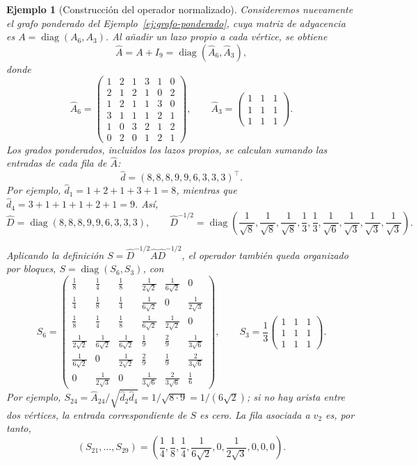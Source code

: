\documentclass[a4paper,openany,oneside,10pt]{report}
\theoremstyle{pnlTeorema}
\theoremstyle{pnlDefinicion}
\theoremstyle{pnlObservacion}
\newtheorem{ejemplo}{Ejemplo}[section]
\begin{document}
\begin{ejemplo}[Construcción del operador normalizado]\label{ej:operador-normalizado}
Consideremos nuevamente el grafo ponderado del Ejemplo~\ref{ej:grafo-ponderado}, cuya matriz de adyacencia es \(A=\operatorname{diag}(A_6,A_3)\). Al añadir un lazo propio a cada vértice, se obtiene
\[
\widehat A=A+I_9=\operatorname{diag}(\widehat A_6,\widehat A_3),
\]
donde
\[
\widehat A_6=\begin{pmatrix}
1&2&1&3&1&0\\
2&1&2&1&0&2\\
1&2&1&1&3&0\\
3&1&1&1&2&1\\
1&0&3&2&1&2\\
0&2&0&1&2&1
\end{pmatrix},\qquad
\widehat A_3=\begin{pmatrix}
1&1&1\\
1&1&1\\
1&1&1
\end{pmatrix}.
\]
Los grados ponderados, incluidos los lazos propios, se calculan sumando las entradas de cada fila de \(\widehat A\):
\[
\widehat d=(8,8,8,9,9,6,3,3,3)^\top.
\]
Por ejemplo, \(\widehat d_1=1+2+1+3+1=8\), mientras que \(\widehat d_4=3+1+1+1+2+1=9\). Así,
\[
\widehat D=\operatorname{diag}(8,8,8,9,9,6,3,3,3),
\qquad
\widehat D^{-1/2}=\operatorname{diag}\left(
\frac1{\sqrt8},\frac1{\sqrt8},\frac1{\sqrt8},\frac13,\frac13,\frac1{\sqrt6},
\frac1{\sqrt3},\frac1{\sqrt3},\frac1{\sqrt3}\right).
\]

Aplicando la definición \(S=\widehat D^{-1/2}\widehat A\widehat D^{-1/2}\), el operador también queda organizado por bloques, \(S=\operatorname{diag}(S_6,S_3)\), con
\[
S_6=\begin{pmatrix}
\frac18&\frac14&\frac18&\frac1{2\sqrt2}&\frac1{6\sqrt2}&0\\
\frac14&\frac18&\frac14&\frac1{6\sqrt2}&0&\frac1{2\sqrt3}\\
\frac18&\frac14&\frac18&\frac1{6\sqrt2}&\frac1{2\sqrt2}&0\\
\frac1{2\sqrt2}&\frac1{6\sqrt2}&\frac1{6\sqrt2}&\frac19&\frac29&\frac1{3\sqrt6}\\
\frac1{6\sqrt2}&0&\frac1{2\sqrt2}&\frac29&\frac19&\frac2{3\sqrt6}\\
0&\frac1{2\sqrt3}&0&\frac1{3\sqrt6}&\frac2{3\sqrt6}&\frac16
\end{pmatrix},
\qquad
S_3=\frac13\begin{pmatrix}1&1&1\\1&1&1\\1&1&1\end{pmatrix}.
\]
Por ejemplo, \(S_{24}=\widehat A_{24}/\sqrt{\widehat d_2\widehat d_4}=1/\sqrt{8\cdot9}=1/(6\sqrt2)\); si no hay arista entre dos vértices, la entrada correspondiente de \(S\) es cero. La fila asociada a \(v_2\) es, por tanto,
\[
(S_{21},\ldots,S_{29})=\left(\frac14,\frac18,\frac14,\frac1{6\sqrt2},0,\frac1{2\sqrt3},0,0,0\right).
\]


\end{ejemplo}
\end{document}
